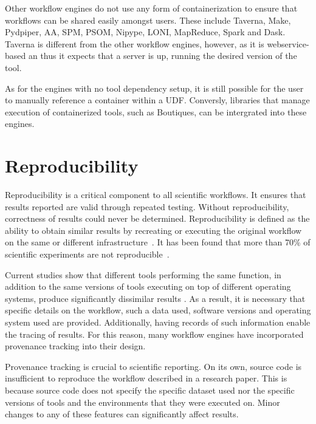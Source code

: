             Other workflow engines do not use any form of containerization to
            ensure that workflows can be shared easily amongst users. These
            include Taverna, Make, Pydpiper, AA, SPM, PSOM, Nipype, LONI,
            MapReduce, Spark and Dask. Taverna is different from the other
            workflow engines, however, as it is webservice-based an thus it
            expects that a server is up, running the desired version of the
            tool.

            As for the engines with no tool dependency setup, it is still
            possible for the user to manually reference a container within a
            UDF. Conversly, libraries that manage execution of containerized
            tools, such as Boutiques, can be intergrated into these engines.

    \section{Reproducibility}\label{reproducibility} Reproducibility is a
        critical component to all scientific workflows. It ensures that results
        reported are valid through repeated testing. Without reproducibility,
        correctness of results could never be determined. Reproducibility is
        defined as the ability to obtain similar results by recreating or
        executing the original workflow on the same or different
        infrastructure~\cite{Peng1226}. It has been found that more than 70\% of
        scientific experiments are not reproducible~\cite{baker2016there}. 

        Current studies show that different tools performing the same function,
        in addition to the same versions of tools executing on top of different
        operating systems, produce significantly dissimilar results
        \cite{bowring:inserm-01760535, 10.1371/journal.pone.0038234,
        10.3389/fninf.2015.00012}. As a result, it is necessary that specific
        details on the workflow, such a data used, software versions and
        operating system used are provided. Additionally, having records of such
        information enable the tracing of results. For this reason, many
        workflow engines have incorporated provenance tracking into their
        design.

            Provenance tracking is crucial to scientific reporting. On its own,
            source code is insufficient to reproduce the workflow described in a
            research paper. This is because source code does not specify the
            specific dataset used nor the specific versions of tools and the
            environments that they were executed on. Minor changes to any of
            these features can significantly affect results.

